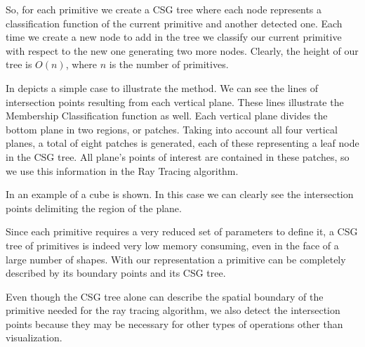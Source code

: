\documentclass[10pt, conference]{IEEEtran}
\begin{document}
So, for each primitive we create a CSG tree where each node represents a classification function of the current primitive and another detected one. Each time we create a new node to add in the tree we classify our current primitive with respect to the new one generating two more nodes. Clearly, the height of our tree is $O(n)$, where $n$ is the number of primitives.

In  depicts a simple case to illustrate the method. We can see the lines of intersection points resulting from each vertical plane. These lines illustrate the Membership Classification function as well. Each vertical plane divides the bottom plane in two regions, or patches. Taking into account all four vertical planes, a total of eight patches is generated, each of these representing a leaf node in the CSG tree. All plane's points of interest are contained in these patches, so we use this information in the Ray Tracing algorithm.


In  an example of a cube is shown. In this case we can clearly see the intersection points delimiting the region of the plane.


Since each primitive requires a very reduced set of parameters to define it, a CSG tree of primitives is indeed very low memory consuming, even in the face of a large number of shapes. With our representation a primitive can be completely described by its boundary points and its CSG tree.

Even though the CSG tree alone can describe the spatial boundary of the primitive needed for the ray tracing algorithm, we also detect the intersection points because they may be necessary for other types of operations other than visualization.
\end{document}
